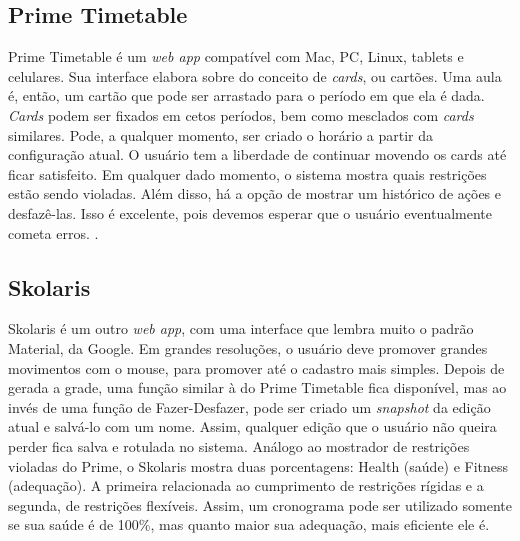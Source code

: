 \documentclass[12pt,a4paper]{article}
\begin{document}
		\subsection{Prime Timetable}

			\par Prime Timetable é um \textit{web app} compatível com Mac, PC, Linux, tablets e celulares. Sua interface elabora sobre do conceito de \textit{cards}, ou cartões. Uma aula é, então, um cartão que pode ser arrastado para o período em que ela é dada.  \textit{Cards} podem ser fixados em cetos períodos, bem como mesclados com \textit{cards} similares. Pode, a qualquer momento, ser criado o horário a partir da configuração atual. O usuário tem a liberdade de continuar movendo os cards até ficar satisfeito. Em qualquer dado momento, o sistema mostra quais restrições estão sendo violadas. Além disso, há a opção de mostrar um histórico de ações e desfazê-las. Isso é excelente, pois devemos esperar que o usuário eventualmente cometa erros. \cite{norman, gnome_hig}.

		\subsection{Skolaris}

			\par Skolaris é um outro \textit{web app}, com uma interface que lembra muito o padrão Material, da Google. Em grandes resoluções, o usuário deve promover grandes movimentos com o mouse, para promover até o cadastro mais simples. Depois de gerada a grade, uma função similar à do Prime Timetable fica disponível, mas ao invés de uma função de Fazer-Desfazer, pode ser criado um \textit{snapshot} da edição atual e salvá-lo com um nome. Assim, qualquer edição que o usuário não queira perder fica salva e rotulada no sistema. Análogo ao mostrador de restrições violadas do Prime, o Skolaris mostra duas porcentagens: Health (saúde) e Fitness (adequação). A primeira relacionada ao cumprimento de restrições rígidas e a segunda, de restrições flexíveis. Assim, um cronograma pode ser utilizado somente se sua saúde é de 100\%, mas quanto maior sua adequação, mais eficiente ele é.


\end{document}
